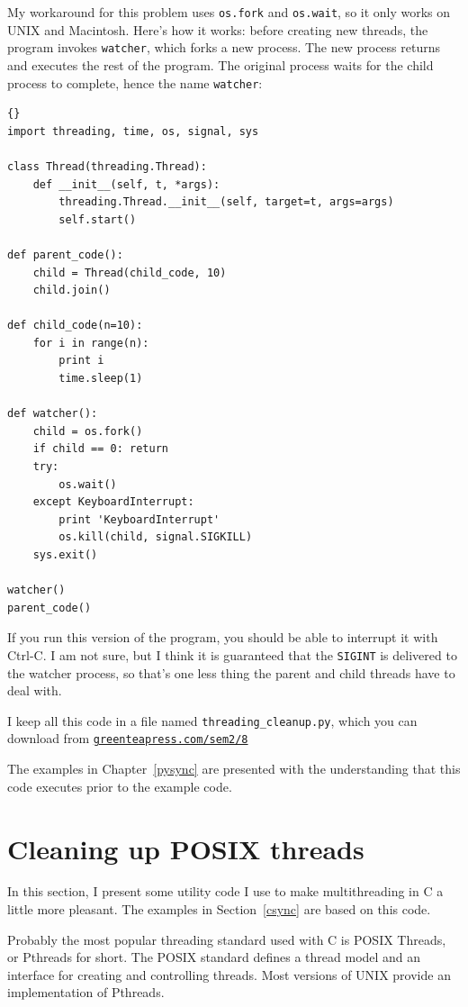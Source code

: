 \documentclass{book}
\newcommand{\shortlink}[1]{\href{https://greenteapress.com/sem2/#1}{\nolinkurl{greenteapress.com/sem2/#1}}}
\begin{document}
My workaround for this problem uses {\tt os.fork} and {\tt os.wait},
so it only works on UNIX and Macintosh.  Here's how it works:
before creating new threads, the program invokes {\tt watcher},
which forks a new process.  The new process returns and executes
the rest of the program.  The original process waits for the
child process to complete, hence the name {\tt watcher}:

\begin{lstlisting}[title={The watcher}]{}
import threading, time, os, signal, sys

class Thread(threading.Thread):
    def __init__(self, t, *args):
        threading.Thread.__init__(self, target=t, args=args)
        self.start()

def parent_code():
    child = Thread(child_code, 10)
    child.join()

def child_code(n=10):
    for i in range(n):
        print i
        time.sleep(1)

def watcher():
    child = os.fork()
    if child == 0: return
    try:
        os.wait()
    except KeyboardInterrupt:
        print 'KeyboardInterrupt'
        os.kill(child, signal.SIGKILL)
    sys.exit()

watcher()
parent_code()
\end{lstlisting}

If you run this version of the program, you should be able
to interrupt it with Ctrl-C.  I am not sure, but I think it
is guaranteed that the {\tt SIGINT} is delivered to the
watcher process, so that's one less thing the
parent and child threads have to deal with.

I keep all this code in a file named {\tt threading\_cleanup.py},
which you can download from
\shortlink{8}


The examples in Chapter~\ref{pysync} are presented with the understanding
that this code executes prior to the example code.


\chapter{Cleaning up POSIX threads}
\label{ccleanup}

In this section, I present some utility code I use to make
multithreading in C a little more pleasant.  The examples in
Section~\ref{csync} are based on this code.

Probably the most popular threading standard used with C is
POSIX Threads, or Pthreads for short.  The POSIX standard defines
a thread model and an interface for creating and controlling
threads.  Most versions of UNIX provide an implementation of
Pthreads.
\end{document}
